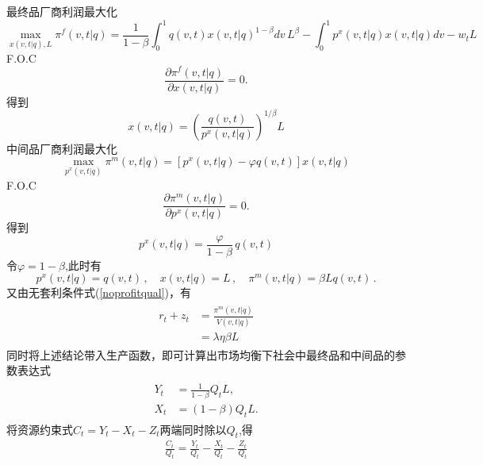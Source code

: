 \documentclass[cn,normal,11pt,black]{elegantnote}
\begin{document}
    最终品厂商利润最大化
    \begin{equation}
        \max_{x(v,t|q), L} \pi^{f}(v,t|q) = \frac{1}{1-\beta} \int_0^1 q(v,t)x(v,t|q)^{1-\beta} dv \, L^\beta -
                                  \int_0^1 p^x(v,t|q)x(v,t|q)dv - w_t L
    \end{equation}
    F.O.C
    \begin{equation}
        \frac{\partial \pi^{f}(v,t|q)}{\partial x(v,t|q)} = 0.
    \end{equation}
    得到
    \begin{equation}
        x(v,t|q) = \left(\frac{q(v,t)}{p^x(v,t|q)}\right)^{1/\beta} L
    \end{equation}
    中间品厂商利润最大化
    \begin{equation}
        \max_{p^x(v,t|q)} \pi^{m}(v,t|q) = \left[ p^x(v,t|q) - \varphi q(v,t) \right] x(v,t|q)
    \end{equation}
    F.O.C
    \begin{equation}
        \frac{\partial \pi^{m}(v,t|q)}{\partial p^x(v,t|q)} = 0.
    \end{equation}
    得到
    \begin{equation}
        p^x(v,t|q) = \frac{\varphi}{1-\beta} \, q(v,t)
    \end{equation}
    令$\varphi = 1-\beta$,此时有
    \begin{equation}
        p^x(v,t|q) = q(v,t) \, , \quad x(v,t|q) = L \, , \quad \pi^m(v,t|q) = \beta Lq(v,t) \, .
    \end{equation}
    又由无套利条件式(\ref{noprofitqual})，有
    \begin{align}\label{rzqual}
    \begin{aligned}
        r_t + z_t & = \frac{\pi^m(v,t|q)}{V(v,t|q)} \\
          & = \lambda \eta \beta L 
    \end{aligned}
    \end{align}
    同时将上述结论带入生产函数，即可计算出市场均衡下社会中最终品和中间品的参数表达式
    \begin{align}\label{qualnetoutput}
        \begin{aligned}
            Y_t & = \frac{1}{1-\beta} Q_t L, \\
            X_t & = (1-\beta) Q_t L. 
        \end{aligned}
    \end{align}
    将资源约束式$C_t = Y_t - X_t - Z_t$两端同时除以$Q_t$,得
    \begin{align}
        \frac{C_t}{Q_t} = \frac{Y_t}{Q_t} - \frac{X_t}{Q_t} - \frac{Z_t}{Q_t}
    \end{align}
\end{document}
